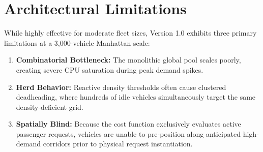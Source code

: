 \documentclass[12pt,a4paper]{article}
\begin{document}
\section{Architectural Limitations}
While highly effective for moderate fleet sizes, Version 1.0 exhibits three primary limitations at a 3,000-vehicle Manhattan scale:
\begin{enumerate}
    \item \textbf{Combinatorial Bottleneck:} The monolithic global pool scales poorly, creating severe CPU saturation during peak demand spikes.
    \item \textbf{Herd Behavior:} Reactive density thresholds often cause clustered deadheading, where hundreds of idle vehicles simultaneously target the same density-deficient grid.
    \item \textbf{Spatially Blind:} Because the cost function exclusively evaluates active passenger requests, vehicles are unable to pre-position along anticipated high-demand corridors prior to physical request instantiation.
\end{enumerate}
\end{document}
